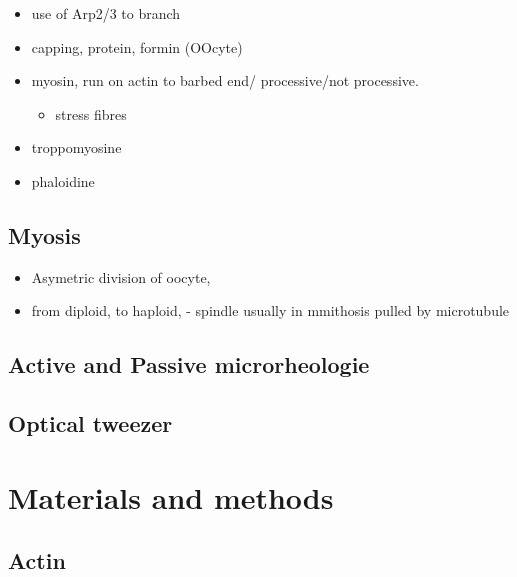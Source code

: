 \documentclass[A4paperpaper,11pt,english]{sphinxmanual}
\begin{document}
\begin{itemize}
\item {} 
use of Arp2/3 to branch

\item {} 
capping, protein,  formin (OOcyte)

\item {} 
myosin, run on actin to barbed end/ processive/not processive.
\begin{itemize}
\item {} 
stress fibres

\end{itemize}

\item {} 
troppomyosine

\item {} 
phaloidine

\end{itemize}


\section{Myosis}
\label{parts/part1:myosis}\begin{itemize}
\item {} 
Asymetric division of oocyte,

\item {} 
from diploid, to haploid,
- spindle usually in mmithosis pulled by microtubule

\end{itemize}


\section{Active and Passive microrheologie}
\label{parts/part1:active-and-passive-microrheologie}

\section{Optical tweezer}
\label{parts/part1:optical-tweezer}

\chapter{Materials and methods}
\label{parts/part2::doc}\label{parts/part2:materials-and-methods}

\section{Actin}
\label{parts/part2:actin}
\end{document}
